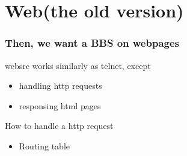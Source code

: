 \documentclass[slidestop,compress,mathserif]{beamer}
\begin{document}
  \section{Web(the old version)}
  \begin{frame}
    \pause
    \frametitle{Then, we want a BBS on webpages}
    \begin{block}{websrc works similarly as telnet, except}
      \begin{itemize}
        \item handling http requests
        \item responsing html pages
      \end{itemize}
    \end{block}
    \pause
    \begin{block}{How to handle a http request}
      \begin{itemize}
        \item Routing table
      \end{itemize}
    \end{block}
  \end{frame}
\end{document}
